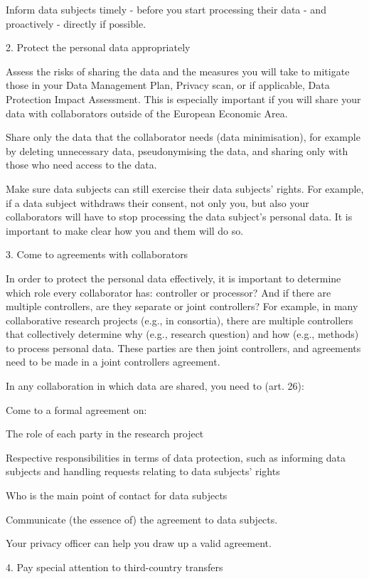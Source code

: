 \documentclass[
]{book}
\begin{document}
Inform data subjects timely - before you start processing
their data - and proactively - directly if possible.

2. Protect the personal data appropriately

Assess the risks of sharing the
data and the measures you will take to mitigate those in your
Data Management Plan, Privacy scan,
or if applicable, Data Protection Impact Assessment.
This is especially important if you will share your data with
collaborators outside of the European Economic Area.

Share only the data that the collaborator needs (data minimisation),
for example by deleting unnecessary data, pseudonymising the data, and
sharing only with those who need access to the data.

Make sure data subjects can still exercise their
data subjects' rights. For example,
if a data subject withdraws their consent, not only you, but also your
collaborators will have to stop processing the data subject's personal
data. It is important to make clear how you and them will do so.

3. Come to agreements with collaborators

In order to protect the personal data effectively, it is important to
determine which role every collaborator has:
controller or processor? And if there are
multiple controllers, are they separate or joint controllers? For example,
in many collaborative research projects (e.g., in consortia), there are
multiple controllers that collectively determine why (e.g., research
question) and how (e.g., methods) to process personal data. These parties
are then joint controllers, and agreements need to be made in a
joint controllers agreement.

In any collaboration in which data are shared, you need to (art. 26):

Come to a formal agreement on:

The role of each party in the research project

Respective responsibilities in terms of data protection, such as informing data subjects and handling requests relating to data subjects' rights

Who is the main point of contact for data subjects

Communicate (the essence of) the agreement to data subjects.

Your
privacy officer
can help you draw up a valid agreement.

4. Pay special attention to third-country transfers
\end{document}
